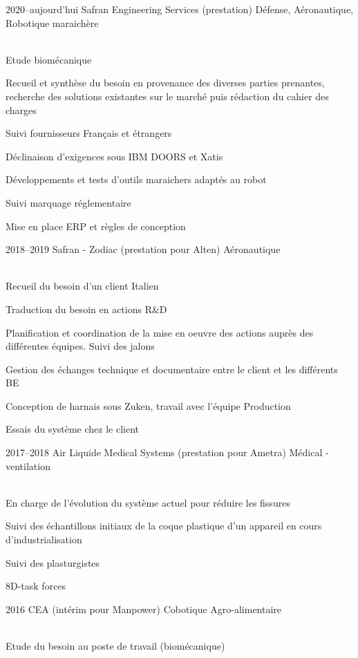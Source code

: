 \documentclass{cv-style}     %
\begin{document}
\begin{entrylist}
\entry
  {2020--aujourd'hui }
  {Safran Engineering Services (prestation)}
  {Défense, Aéronautique, Robotique maraichère}
  {\\
  Etude biomécanique

  Recueil et synthèse du besoin en provenance des diverses parties prenantes, recherche des solutions existantes sur le marché puis rédaction du cahier des charges

  Suivi fournisseurs Français et étrangers

  Déclinaison d’exigences sous IBM DOORS et Xatis

  Développements et tests d'outils maraichers adaptés au robot

  Suivi marquage réglementaire

  Mise en place ERP et règles de conception

  }
\entry
  {2018--2019 }
  {Safran - Zodiac (prestation pour Alten)}
  {Aéronautique}
  {\\
  Recueil du besoin d'un client Italien

  Traduction du besoin en actions R\&D
  
  Planification et coordination de la mise en oeuvre des actions auprès des différentes équipes. Suivi des jalons

  Gestion des échanges technique et documentaire entre le client et les différents BE

  Conception de harnais sous Zuken, travail avec l'équipe Production

  Essais du système chez le client
 
  }
\entry
 {2017--2018 }
 {Air Liquide Medical Systems (prestation pour Ametra)}
 {Médical - ventilation}
 {\\
 En charge de l'évolution du système actuel pour réduire les fissures

 Suivi des échantillons initiaux de la coque plastique d'un appareil en cours d'industrialisation

 Suivi des plasturgistes

 8D-task forces

 }
\entry
 {2016 }
 {CEA (intérim pour Manpower)}
 {Cobotique Agro-alimentaire}
 {\\
 Etude du besoin au poste de travail (biomécanique)

}
\end{entrylist}
\end{document}
